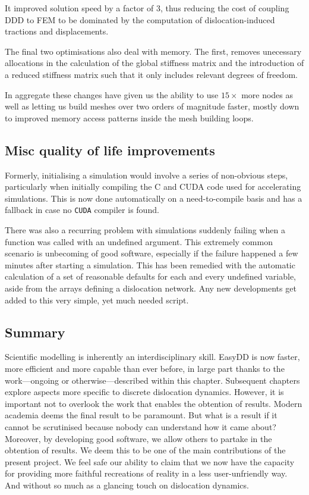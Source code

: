 It improved solution speed by a factor of 3, thus reducing the cost of coupling DDD to FEM to be dominated by the computation of dislocation-induced tractions and displacements.

The final two optimisations also deal with memory. The first, removes unecessary allocations in the calculation of the global stiffness matrix and the introduction of a reduced stiffness matrix such that it only includes relevant degrees of freedom.

In aggregate these changes have given us the ability to use $15 \times$ more nodes as well as letting us build meshes over two orders of magnitude faster, mostly down to improved memory access patterns inside the mesh building loops.

\subsection{Misc quality of life improvements}

Formerly, initialising a simulation would involve a series of non-obvious steps, particularly when initially compiling the C and CUDA code used for accelerating simulations. This is now done automatically on a need-to-compile basis and has a fallback in case no \texttt{CUDA} compiler is found.

There was also a recurring problem with simulations suddenly failing when a function was called with an undefined argument. This extremely common scenario is unbecoming of good software, especially if the failure happened a few minutes after starting a simulation. This has been remedied with the automatic calculation of a set of reasonable defaults for each and every undefined variable, aside from the arrays defining a dislocation network. Any new developments get added to this very simple, yet much needed script.

\subsection{Summary}

Scientific modelling is inherently an interdisciplinary skill. EasyDD is now faster, more efficient and more capable than ever before, in large part thanks to the work---ongoing or otherwise---described within this chapter. Subsequent chapters explore aspects more specific to discrete dislocation dynamics. However, it is important not to overlook the work that enables the obtention of results. Modern academia deems the final result to be paramount. But what is a result if it cannot be scrutinised because nobody can understand how it came about? Moreover, by developing good software, we allow others to partake in the obtention of results. We deem this to be one of the main contributions of the present project. We feel safe our ability to claim that we now have the capacity for providing more faithful recreations of reality in a less user-unfriendly way. And without so much as a glancing touch on dislocation dynamics.
